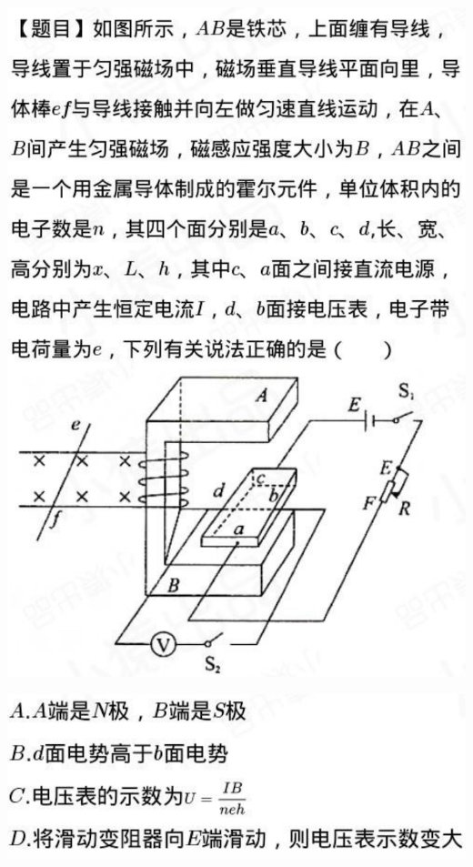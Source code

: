 \documentclass{article}
\begin{document}
\begin{minipage}{0.45\textwidth}
    \includegraphics[width=\textwidth,keepaspectratio]{./pictures/9-1.png}
\end{minipage}
\hfill
\begin{minipage}{0.45\textwidth}
    \vspace{-20em}
    \includegraphics[width=\textwidth,keepaspectratio]{./pictures/9-2.png}
\end{minipage}
\end{document}
